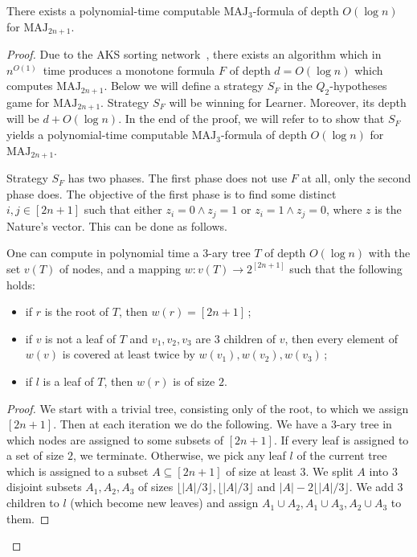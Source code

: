 \documentclass{toc}
\def\MAJ{\mathrm{MAJ}}
\begin{document}
\begin{theorem}
\label{cohen_conj_11}
There exists a polynomial-time computable 
%
$\MAJ_3$-formula of depth $O(\log n)$  %
for $\MAJ_{2n + 1}$.
\end{theorem}
\begin{proof}
Due to the AKS sorting network~\cite{AKS83},
there exists an algorithm which in
%
$n^{O(1)}$~time   %
produces a monotone formula $F$ of depth $d = O(\log n)$ which computes $\MAJ_{2n + 1}$. Below we will define a strategy $S_F$  in the $Q_2$-hypotheses game for $\MAJ_{2n + 1}$. Strategy $S_F$ will be winning for Learner. Moreover, its depth will be $d + O(\log n)$. In the end of the proof, we will refer to  to show that $S_F$ yields 
%
a polynomial-time computable $\MAJ_3$-formula
of depth $O(\log n)$  %
for $\MAJ_{2n + 1}$.

 Strategy $S_F$ has two phases. The first phase does not use $F$ at all, only the second phase does. The objective of the first phase is to find some distinct $i, j\in [2n + 1]$ such that either $z_i = 0 \land z_j = 1$ or $z_i = 1 \land z_j = 0$, where $z$ is the Nature's vector. This can be done as  follows.
\begin{lemma} 
\label{tree_lemma}
One can compute in polynomial time a 3-ary tree $T$ of depth $O(\log n)$ 
with the %
set $v(T)$ of nodes,   %
and a mapping $w\colon v(T) \to 2^{[2n + 1]}$ such that the following holds:
\begin{itemize}
%
\item if $r$ is the root of $T$, then $w(r) = [2n + 1]$\,;  %
\item if $v$ is not a leaf of $T$ and $v_1, v_2, v_3$ are $3$ children of $v$, then every element of $w(v)$ is covered at least twice by $w(v_1), w(v_2), w(v_3)$\,;   %
\item if $l$ is a leaf of $T$, then $w(r)$ is of size $2$.
\end{itemize}
\end{lemma}
\begin{proof}
  We start with a trivial tree, consisting only of the root, to which we assign $[2n + 1]$. Then at each iteration we do the following. We have a $3$-ary tree in which nodes are assigned to some subsets of $[2n + 1]$. If every leaf is assigned to a set of size $2$, we terminate. Otherwise, we pick any leaf $l$ of the current tree which is assigned to a subset $A\subseteq [2n + 1]$ of size at least $3$. We split $A$ into $3$ disjoint subsets $A_1, A_2, A_3$ of sizes $\lfloor |A|/3\rfloor, \lfloor |A|/3 \rfloor$ and $|A| - 2\lfloor |A|/3\rfloor$. We add $3$ children to $l$ (which become new
%
leaves)   %
and assign $A_1\cup A_2, A_1 \cup A_3, A_2 \cup A_3$ to them.


\end{proof}
\end{proof}
\end{document}
